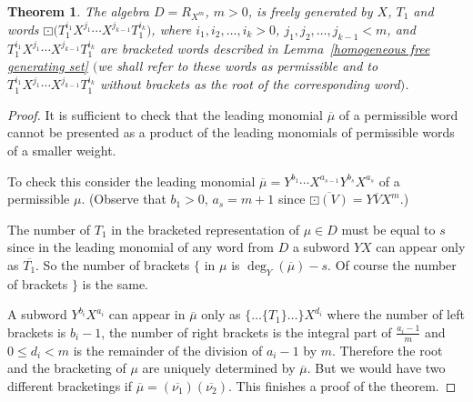 \documentclass[11pt]{article}
\numberwithin{equation}{section}
\newtheorem{Theorem}{Theorem}[section]
\begin{document}
\begin{Theorem}The algebra $D = R_{X^m}$, $m > 0$, is freely generated by $X$, $T_1$ and words $\boxdot\big(T_1^{i_1}X^{j_1} \cdots \allowbreak X^{j_{k-1}}T_1^{i_k}\big)$, where $i_1, i_2, \ldots,i_k > 0$, $j_1, j_2, \ldots, j_{k-1} < m$, and $T_1^{i_1}X^{j_1} \cdots X^{j_{k-1}}T_1^{i_k}$ are bracketed words described in Lemma~{\rm \ref{homogeneous free generating set}} $($we shall refer to these words as permissible and to $T_1^{i_1}X^{j_1} \cdots X^{j_{k-1}}T_1^{i_k}$ without brackets as the root of the corresponding word$)$.
\end{Theorem}

\begin{proof}It is sufficient to check that the leading monomial $\overline{\mu}$ of a permissible word cannot be presented as a product of the leading monomials of permissible words of a smaller weight.

To check this consider the leading monomial $\overline{\mu} = Y^{b_1} \cdots X^{a_{s-1}}Y^{b_s}X^{a_s}$ of a permissible $\mu$. (Observe that $b_1 > 0$, $a_s = m+1$ since $\overline{\boxdot(V)} =Y\overline{V}X^m$.)

The number of $T_1$ in the bracketed representation of $\mu \in D$ must be equal to $s$ since in the leading monomial of any word from $D$ a subword $YX$ can appear only as $\overline{T_1}$. So the number of brackets $\{$ in $\mu$ is $\deg_Y(\overline{\mu}) - s$. Of course the number of brackets $\}$ is the same.

A subword $Y^{b_i}X^{a_i}$ can appear in $\overline{\mu}$ only as $\{\ldots\{T_1\}\ldots\}X^{d_i}$ where the number of left brackets is $b_i - 1$, the number of right brackets is the integral part of $\frac{a_i - 1}{m}$ and $0 \leq d_i <m$ is the remainder of the division of $a_i - 1$ by $m$. Therefore the root and the bracketing of $\mu$ are uniquely determined by $\overline{\mu}$. But we would have two different bracketings if $\overline{\mu} = (\overline{\nu_1})(\overline{\nu_2})$. This finishes a proof of the theorem.
\end{proof}
\end{document}
